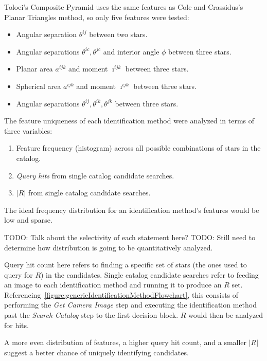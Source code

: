 Toloei's Composite Pyramid uses the same features as Cole and Crassidus's Planar Triangles method, so only five
features were tested:
\begin{itemize}
    \item Angular separation $\theta^{ij}$ between two stars.

    \item Angular separations $\theta^{ic}, \theta^{jc}$ and interior angle $\phi$ between three stars.
    \item Planar area $a^{ijk}$ and moment $\imath^{ijk}$ between three stars.
    \item Spherical area $a^{ijk}$ and moment $\imath^{ijk}$ between three stars.
    \item Angular separations $\theta^{ij}, \theta^{ik}, \theta^{jk}$ between three stars.
\end{itemize}

The feature uniqueness of each identification method were analyzed in terms of three variables:
\begin{enumerate}
    \item \label{itm:featureDist} Feature frequency (histogram) across all possible combinations of stars in the
    catalog.
    \item \label{itm:hitCountFeature} \textit{Query hits} from single catalog candidate searches.
    \item $|R|$ from single catalog candidate searches.
\end{enumerate}

The ideal frequency distribution for an identification method's features would be low and sparse.


TODO: Talk about the selectivity of each statement here?
TODO: Still need to determine how distribution is going to be quantitatively analyzed.

Query hit count here refers to finding a specific set of stars (the ones used to query for $R$) in the candidates.
Single catalog candidate searches refer to feeding an image to each identification method and running it to produce
an $R$ set.
Referencing~\autoref{figure:genericIdentificationMethodFlowchart}, this consists of performing the \textit{Get Camera
Image} step and executing the identification method past the \textit{Search Catalog} step to the first decision
block.
$R$ would then be analyzed for hits.

A more even distribution of features, a higher query hit count, and a smaller $|R|$ suggest a better chance of uniquely
identifying candidates.

